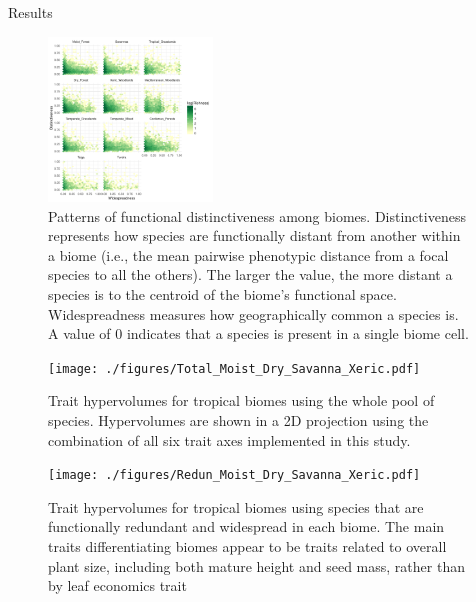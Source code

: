 \documentclass[final]{beamer}
\newlength{\twocolwid}
\begin{document}
\begin{frame}[t]
\begin{columns}[t]
\begin{column}{\twocolwid}
\begin{block}{Results}


		 
\begin{multicols}{2}

\begin{figure}[h]
	\centering
	\includegraphics[width=0.39\textwidth]{./figures/All_biomes_heatmap_logTraits.pdf}
	\caption{Patterns of functional distinctiveness among biomes. Distinctiveness represents how species are functionally distant from another within a biome (i.e., the mean pairwise phenotypic distance from a focal species to all the others). The larger the value, the more distant a species is to the centroid of the biome's functional space. Widespreadness measures how geographically common a species is. A value of 0 indicates that a species is present in a single biome cell.}
	\label{fig:distinct_common}
\end{figure}


 
\begin{figure}[h]
	\centering
	\texttt{[image: ./figures/Total\_Moist\_Dry\_Savanna\_Xeric.pdf]}
	\caption{Trait hypervolumes for tropical biomes using the whole pool of species. Hypervolumes are shown in a 2D projection using the combination of all six trait axes implemented in this study.}
	\label{fig:hypervolumes1}
\end{figure}

\begin{figure}[h]
	\centering
	\texttt{[image: ./figures/Redun\_Moist\_Dry\_Savanna\_Xeric.pdf]}
	\caption{Trait hypervolumes for tropical biomes using species that are functionally redundant and widespread in each biome. The main traits differentiating biomes appear to be traits related to overall plant size, including both mature height and seed mass, rather than by leaf economics trait}
	\label{fig:hypervolumes2}
\end{figure}


\end{multicols}
\end{block}



\end{column}
\end{columns}
\end{frame}
\end{document}
